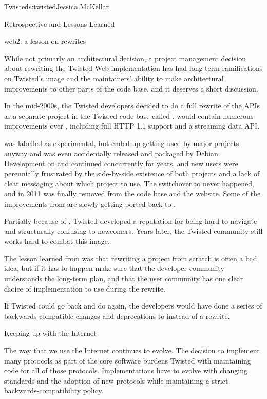 \begin{aosachapter}{Twisted}{s:twisted}{Jessica McKellar}
\begin{aosasect1}{Retrospective and Lessons Learned}
\begin{aosasect2}{web2: a lesson on rewrites}

While not primarly an architectural decision, a project management decision
about rewriting the Twisted Web implementation has had long-term ramifications
on Twisted's image and the maintainers' ability to make architectural
improvements to other parts of the code base, and it deserves a short
discussion.

In the mid-2000s, the Twisted developers decided to do a full rewrite of the
 APIs as a separate project in the Twisted code base
called .  would contain numerous improvements
over , including full HTTP 1.1 support and a streaming
data API.

 was labelled as experimental, but ended up getting used by
major projects anyway and was even accidentally released and packaged by
Debian. Development on  and  continued
concurrently for years, and new users were perennially frustrated by the
side-by-side existence of both projects and a lack of clear messaging about
which project to use. The switchover to  never happened, and in
2011  was finally removed from the code base and the
website. Some of the improvements from  are slowly getting
ported back to .

Partially because of , Twisted developed a reputation for
being hard to navigate and structurally confusing to newcomers. Years later, the
Twisted community still works hard to combat this image.

The lesson learned from  was that rewriting a project from
scratch is often a bad idea, but if it has to happen make sure that the
developer community understands the long-term plan, and that the user community
has one clear choice of implementation to use during the rewrite.

If Twisted could go back and do  again, the developers would
have done a series of backwards-compatible changes and deprecations to
 instead of a rewrite.

\end{aosasect2}

\begin{aosasect2}{Keeping up with the Internet}

The way that we use the Internet continues to evolve. The decision to
implement many protocols as part of the core software burdens Twisted with
maintaining code for all of those protocols.  Implementations have to evolve
with changing standards and the adoption of new protocols while maintaining a
strict backwards-compatibility policy.


\end{aosasect2}
\end{aosasect1}
\end{aosachapter}
